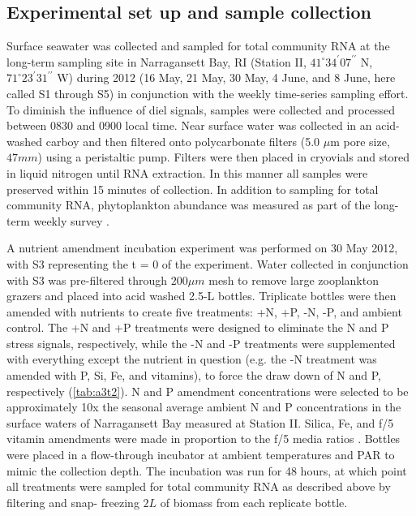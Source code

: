 \subsection{Experimental set up and sample collection}
Surface seawater was collected and sampled for total community RNA at the long-term sampling site in Narragansett Bay, RI (Station II, $41^\circ 34^\prime 07^{\prime \prime}$ N, $71^\circ 23^\prime 31^{\prime \prime}$ W) during 2012 (16 May, 21 May, 30 May, 4 June, and 8 June, here called S1 through S5) in conjunction with the weekly time-series sampling effort. To diminish the influence of diel signals, samples were collected and processed between 0830 and 0900 local time. Near surface water was collected in an acid-washed carboy and then filtered onto polycarbonate filters (5.0 $\mu$m pore size, $47mm$) using a peristaltic pump. Filters were then placed in cryovials and stored in liquid nitrogen until RNA extraction. In this manner all samples were preserved within 15 minutes of collection. In addition to sampling for total community RNA, phytoplankton abundance was measured as part of the long-term weekly survey \citep{Furnas1983, Furnas1982}.\par
A nutrient amendment incubation experiment was performed on 30 May 2012, with S3 representing the t = 0 of the experiment. Water collected in conjunction with S3 was pre-filtered through $200 \mu m$ mesh to remove large zooplankton grazers and placed into acid washed 2.5-L bottles. Triplicate bottles were then amended with nutrients to create five treatments: +N, +P, -N, -P, and ambient control. The +N and +P treatments were designed to eliminate the N and P stress signals, respectively, while the -N and -P treatments were supplemented with everything except the nutrient in question (e.g. the -N treatment was amended with P, Si, Fe, and vitamins), to force the draw down of N and P, respectively (\cref{tab:a3t2}). N and P amendment concentrations were selected to be approximately 10x the seasonal average ambient N and P concentrations in the surface waters of Narragansett Bay measured at Station II. Silica, Fe, and f/5 vitamin amendments were made in proportion to the f/5 media ratios \citep{Guillard1975}. Bottles were placed in a flow-through incubator at ambient temperatures and PAR to mimic the collection depth. The incubation was run for 48 hours, at which point all treatments were sampled for total community RNA as described above by filtering and snap- freezing $2L$ of biomass from each replicate bottle. \par
